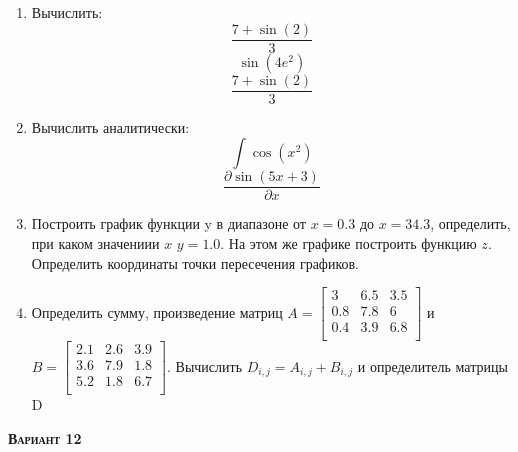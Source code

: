 \begin{enumerate}
\item Вычислить: 
\begin{equation*}\dfrac{7+\sin(2)}{3}              \end{equation*}
\begin{equation*}\sin(4 e^2)                       \end{equation*}
\begin{equation*}\dfrac{7+\sin(2)}{3}              \end{equation*}

\item Вычислить аналитически: 
 \begin{equation*} \int \cos(x^2)          \end{equation*}\begin{equation*} {\dfrac{\partial \sin(5 x +3)}{\partial x}} \end{equation*}
\item Построить график функции y в диапазоне от $x=0.3$ до $x=34.3$, определить, при каком значениии $x$ $y=1.0$. На этом же графике построить функцию $z $. Определить координаты точки пересечения графиков. \item Определить сумму, произведение матриц $A=\begin{bmatrix}
3 &6.5 &3.5 \\
0.8 &7.8 &6 \\
0.4 &3.9 &6.8 \\
\end{bmatrix}
$ и $B=\begin{bmatrix}
2.1 &2.6 &3.9 \\
3.6 &7.9 &1.8 \\
5.2 &1.8 &6.7 \\
\end{bmatrix}
$. Вычислить $D_{i,j}=A_{i,j} + B_{i,j}$ и определитель матрицы D
\end{enumerate}
\textsc{\textbf{Вариант 12}}

